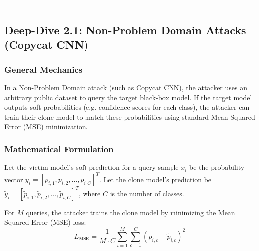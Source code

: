 \documentclass{article}
\begin{document}
---

\subsection{Deep-Dive 2.1: Non-Problem Domain Attacks (Copycat CNN)}

\subsubsection{General Mechanics}
In a Non-Problem Domain attack (such as Copycat CNN), the attacker uses an arbitrary public dataset to query the target black-box model. If the target model outputs soft probabilities (e.g. confidence scores for each class), the attacker can train their clone model to match these probabilities using standard Mean Squared Error (MSE) minimization.

\subsubsection{Mathematical Formulation}
Let the victim model's soft prediction for a query sample $x_i$ be the probability vector $y_i = [p_{i,1}, p_{i,2}, \dots, p_{i,C}]^T$. Let the clone model's prediction be $\tilde{y}_i = [\tilde{p}_{i,1}, \tilde{p}_{i,2}, \dots, \tilde{p}_{i,C}]^T$, where $C$ is the number of classes.

For $M$ queries, the attacker trains the clone model by minimizing the Mean Squared Error (MSE) loss:
\begin{equation}
    L_{\text{MSE}} = \frac{1}{M \cdot C} \sum_{i=1}^M \sum_{c=1}^C \left( p_{i,c} - \tilde{p}_{i,c} \right)^2
\end{equation}
\end{document}
